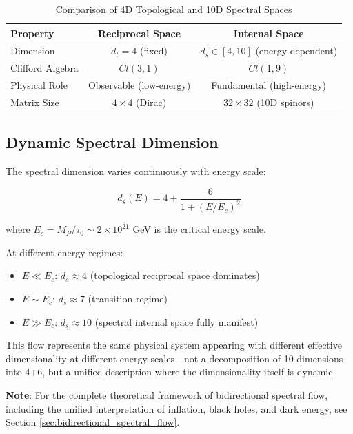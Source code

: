 \begin{table}[htbp]
\centering
\caption{Comparison of 4D Topological and 10D Spectral Spaces}
\begin{tabular}{@{}lcc@{}}
\hline
\textbf{Property} & \textbf{Reciprocal Space} & \textbf{Internal Space} \\
\hline
Dimension & $d_t = 4$ (fixed) & $d_s \in [4, 10]$ (energy-dependent) \\
Clifford Algebra & $Cl(3,1)$ & $Cl(1,9)$ \\
Physical Role & Observable (low-energy) & Fundamental (high-energy) \\
Matrix Size & $4 \times 4$ (Dirac) & $32 \times 32$ (10D spinors) \\
\hline
\end{tabular}
\label{tab:space_comparison}
\end{table}

\subsection{Dynamic Spectral Dimension}

The spectral dimension varies continuously with energy scale:

\begin{equation}
    d_s(E) = 4 + \frac{6}{1 + (E/E_c)^2}
\end{equation}

where $E_c = M_P / \tau_0 \sim 2 \times 10^{21}$ GeV is the critical energy scale.

At different energy regimes:
\begin{itemize}
    \item $E \ll E_c$: $d_s \approx 4$ (topological reciprocal space dominates)
    \item $E \sim E_c$: $d_s \approx 7$ (transition regime)
    \item $E \gg E_c$: $d_s \approx 10$ (spectral internal space fully manifest)
\end{itemize}

This flow represents the same physical system appearing with different effective dimensionality at different energy scales—not a decomposition of 10 dimensions into 4+6, but a unified description where the dimensionality itself is dynamic.

\textbf{Note}: For the complete theoretical framework of bidirectional spectral flow, including the unified interpretation of inflation, black holes, and dark energy, see Section \ref{sec:bidirectional_spectral_flow}.

